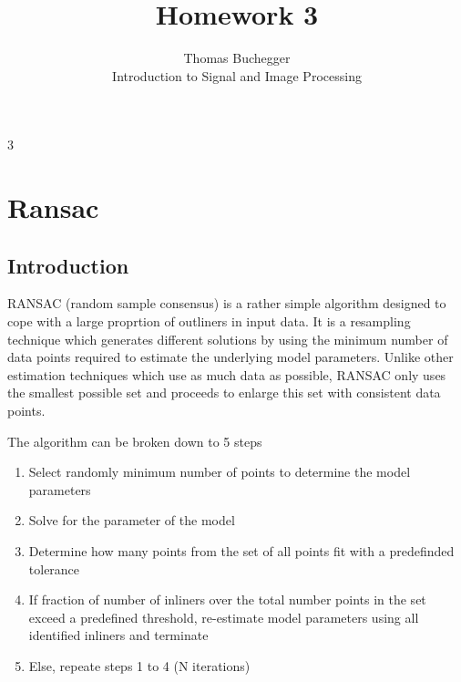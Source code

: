 \documentclass[12pt]{article}
\begin{document}


\title{Homework 3}%
\author{Thomas Buchegger\\ %
Introduction to Signal and Image Processing}
\maketitle

\setcounter{tocdepth}3 %
\tableofcontents

\pagebreak
\section{Ransac}
\subsection{Introduction}
RANSAC (random sample consensus) is a rather simple algorithm designed to cope with a large proprtion of outliners in input data.
It is a resampling technique which generates different solutions by using the minimum number of data points required to estimate 
the underlying model parameters. Unlike other estimation techniques which use as much data as possible, RANSAC only uses the smallest 
possible set and proceeds to enlarge this set with consistent data points.
\newline

The algorithm can be broken down to 5 steps
\begin{enumerate}
    \item Select randomly minimum number of points to determine the model parameters
    \item Solve for the parameter of the model
    \item Determine how many points from the set of all points fit with a predefinded tolerance
    \item If fraction of number of inliners over the total number points in the set exceed a predefined threshold, re-estimate model parameters using all identified inliners and terminate
    \item Else, repeate steps 1 to 4 (N iterations)
\end{enumerate}
\end{document}
